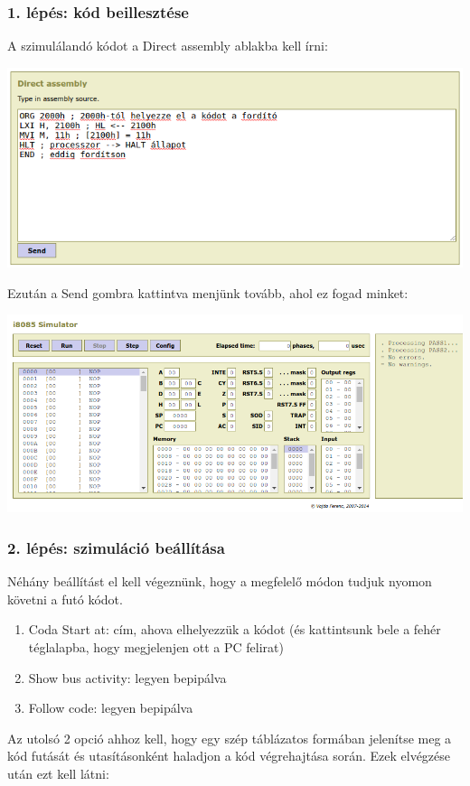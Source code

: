 \documentclass{article}
\begin{document}
\subsubsection{1. lépés: kód beillesztése}
A szimulálandó kódot a Direct assembly ablakba kell írni:

\includegraphics[scale=0.5]{sim_lepes1.png}

Ezután a Send gombra kattintva menjünk tovább, ahol ez fogad minket:

\includegraphics[scale=0.5]{sim_lepes2.png}

\subsubsection{2. lépés: szimuláció beállítása}

Néhány beállítást el kell végeznünk, hogy a megfelelő módon tudjuk nyomon követni a futó kódot.
\begin{enumerate}
	\item Coda Start at: cím, ahova elhelyezzük a kódot (és kattintsunk bele a fehér téglalapba, hogy megjelenjen ott a PC felirat)
	\item Show bus activity: legyen bepipálva
	\item Follow code: legyen bepipálva
\end{enumerate}
Az utolsó 2 opció ahhoz kell, hogy egy szép táblázatos formában jelenítse meg a kód futását és utasításonként haladjon a kód végrehajtása során.
Ezek elvégzése után ezt kell látni:
\end{document}
